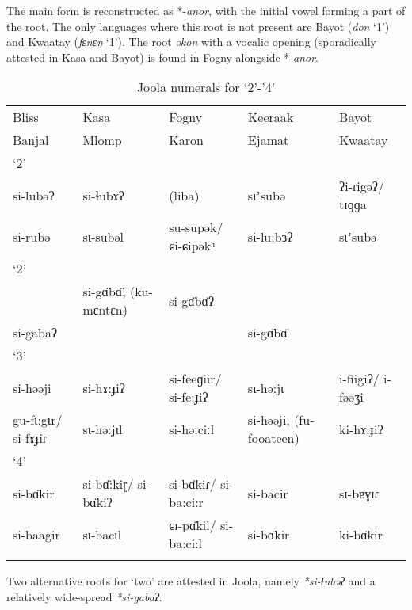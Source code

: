 {The main form is reconstructed as *-\textit{anor}, with the initial vowel forming a part of the root. The only languages where this root is not present are Bayot (\textit{don} ‘1’) and Kwaatay (\textit{fɛnɛŋ} ‘1’). The root \textit{əkon} with a vocalic opening (sporadically attested in Kasa and Bayot) is found in Fogny alongside *-\textit{anor}.


\begin{table}
\caption{\label{tab:3:235}Joola numerals for `2'-'4'}


\begin{tabularx}{\textwidth}{lQQQQ}
\lsptoprule

Bliss & Kasa & Fogny & Keeraak & Bayot\\
Banjal & Mlomp & Karon & Ejamat & Kwaatay\\
\midrule
{{‘2’}} & {} & {} & {} & {}\\
\midrule
si-lubəʔ & si-ɬubɤʔ & (liba) & sɩʼsubə & ʔi-ɾigəʔ/ tɪɡɡa\\
si-rubə & sɩ-subəl & su-supək/ ɕi-ɕipəkʰ & si-lu:bɜʔ & sɩʼsubə\\
\tablevspace
{{‘2}{’}} & {} & {} & {} & {}\\
\midrule
~ & si-g{\"{ɑ}}b{\"{ɑ}}, (ku-mɛntɛn) & si-g{\"{ɑ}}b{\"{ɑ}}ʔ &  & \\
si-gabaʔ &  &  & si-g{\"{ɑ}}b{\"{ɑ}} & \\
\tablevspace
{{‘3}{’}} & {} & {} & {} & {}\\
\midrule
si-həəji & si-hɤ:ɟiʔ & si-feeɡiir/ si-fe:ɟiʔ & sɩ-hə:jɩ & i-fiigiʔ/ i-fəəʒi\\
gu-fɩ:gɩr/ si-fɤɟiɾ & sɩ-hə:jɩl & si-həːciːl & si-həəji, (fu-fooateen) & ki-hɤ:ɟiʔ\\
\tablevspace
{{‘4}{’}} & {} & {} & {} & {}\\
\midrule
si-b{\"{ɑ}}kir & si-b{\"{ɑ}}:kiɽ/ si-b{\"{ɑ}}kiʔ & si-b{\"{ɑ}}kiɾ/ si-ba:ci:r & si-bacir & sɪ-bɐɣɪɾ \\
si-baagir & sɩ-bacɩl & ɕɪ-p{\"{ɑ}}kil/ si-ba:ci:l & si-b{\"{ɑ}}kir & ki-b{\"{ɑ}}kir\\
\lspbottomrule
\end{tabularx}
\end{table}

Two alternative roots for ‘two’ are attested in Joola, namely \textit{*si-ɬubəʔ} and a relatively wide-spread \textit{*si-gabaʔ}.

}
